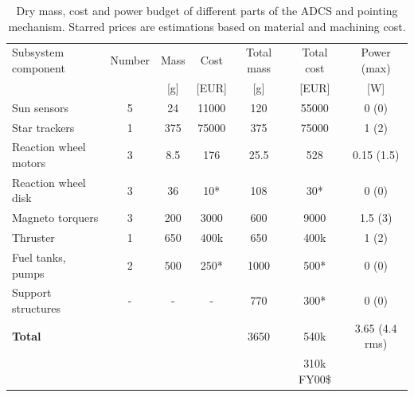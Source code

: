 \begin{table}[h]
\begin{tabular}{l | c | c c | c c | c }
\hline
Subsystem component    & Number & Mass & Cost & Total mass & Total cost & Power (max)\\ 
                       &   & [g] & [EUR]& [g]  &[EUR] & [W]         \\ \hline \hline
Sun sensors            & 5 & 24  & 11000& 120   & 55000&  0 (0)      \\
Star trackers          & 1 & 375 & 75000& 375  & 75000&  1 (2)      \\ \hline
Reaction wheel motors  & 3 & 8.5 & 176  & 25.5 & 528  &  0.15 (1.5) \\
Reaction wheel disk    & 3 & 36  & 10*  & 108   & 30*  &  0 (0)      \\
Magneto torquers       & 3 & 200 & 3000 & 600  & 9000 &  1.5 (3)      \\ \hline
Thruster			   & 1 & 650 & 400k & 650  & 400k &  1 (2)			\\
Fuel tanks, pumps	   & 2 & 500 & 250* & 1000 & 500* & 0 (0)          \\ \hline
Support structures     & - &  -  & -	& 770  & 300*     & 0 (0)			\\ \hline
\textbf{Total} & & &                             & 3650 & 540k & 3.65 (4.4 rms) \\
&&&&& 310k FY00\$ &\\
\hline
\end{tabular}
\caption[Mass, cost and power budget of AODCS and pointing mechanism emitter]{Dry mass, cost and power budget of different parts of the \ac{ADCS} and pointing mechanism. Starred prices are estimations based on material and machining cost.}
\label{tab:adcspointbudgetemitter}
\end{table}